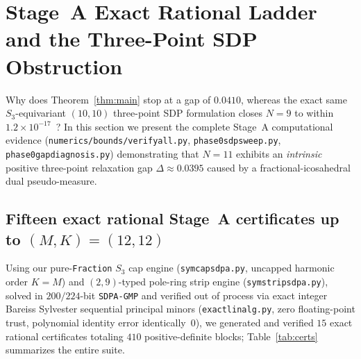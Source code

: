 \documentclass[11pt,reqno]{amsart}
\renewcommand{\_}{\origunderscore\allowbreak}
\theoremstyle{definition}
\begin{document}
\section{Stage~A Exact Rational Ladder and the Three-Point SDP Obstruction}\label{sec:obstruction}

Why does Theorem~\ref{thm:main} stop at a gap of $0.0410$, whereas the exact same $S_3$-equivariant $(10,10)$ three-point SDP formulation closes $N = 9$ to within $1.2 \times 10^{-17}$~\cite{Li2026N9}?
In this section we present the complete Stage~A computational evidence (\texttt{numerics/bounds/verify\_all.py}, \texttt{phase0\_sdp\_sweep.py}, \texttt{phase0\_gap\_diagnosis.py}) demonstrating that $N = 11$ exhibits an \emph{intrinsic} positive three-point relaxation gap $\Delta \approx 0.0395$ caused by a fractional-icosahedral dual pseudo-measure.

\subsection{Fifteen exact rational Stage~A certificates up to \texorpdfstring{$(M,K) = (12,12)$}{(M,K) = (12,12)}}\label{subsec:stagea-ladder}
Using our pure-\texttt{Fraction} $S_3$ cap engine (\texttt{sym\_cap\_sdpa.py}, uncapped harmonic order $K = M$) and $(2,9)$-typed pole-ring strip engine (\texttt{sym\_strip\_sdpa.py}), solved in $200/224$-bit \texttt{SDPA-GMP} and verified out of process via exact integer Bareiss Sylvester sequential principal minors (\texttt{exact\_linalg.py}, zero floating-point trust, polynomial identity error identically~$0$), we generated and verified $15$ exact rational certificates totaling $410$ positive-definite blocks; Table~\ref{tab:certs} summarizes the entire suite.
\end{document}
